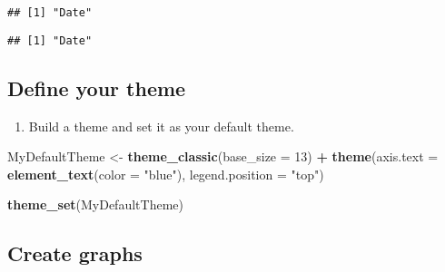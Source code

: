 \documentclass[
]{article}
\newenvironment{Shaded}{\begin{snugshade}}{\end{snugshade}}
\newcommand{\DataTypeTok}[1]{\textcolor[rgb]{0.13,0.29,0.53}{#1}}
\newcommand{\DecValTok}[1]{\textcolor[rgb]{0.00,0.00,0.81}{#1}}
\newcommand{\KeywordTok}[1]{\textcolor[rgb]{0.13,0.29,0.53}{\textbf{#1}}}
\newcommand{\NormalTok}[1]{#1}
\newcommand{\OperatorTok}[1]{\textcolor[rgb]{0.81,0.36,0.00}{\textbf{#1}}}
\newcommand{\StringTok}[1]{\textcolor[rgb]{0.31,0.60,0.02}{#1}}
\providecommand{\tightlist}{%
  \setlength{\itemsep}{0pt}\setlength{\parskip}{0pt}}
\begin{document}
\begin{verbatim}
## [1] "Date"
\end{verbatim}

\begin{Shaded}
\end{Shaded}

\begin{verbatim}
## [1] "Date"
\end{verbatim}

\hypertarget{define-your-theme}{%
\subsection{Define your theme}\label{define-your-theme}}

\begin{enumerate}
\def\labelenumi{\arabic{enumi}.}
\setcounter{enumi}{2}
\tightlist
\item
  Build a theme and set it as your default theme.
\end{enumerate}

\begin{Shaded}
\begin{Highlighting}[]
\NormalTok{MyDefaultTheme <-}\StringTok{ }\KeywordTok{theme_classic}\NormalTok{(}\DataTypeTok{base_size =} \DecValTok{13}\NormalTok{) }\OperatorTok{+}
\StringTok{  }\KeywordTok{theme}\NormalTok{(}\DataTypeTok{axis.text =} \KeywordTok{element_text}\NormalTok{(}\DataTypeTok{color =} \StringTok{"blue"}\NormalTok{),}
        \DataTypeTok{legend.position =} \StringTok{"top"}\NormalTok{)}

\KeywordTok{theme_set}\NormalTok{(MyDefaultTheme)}
\end{Highlighting}
\end{Shaded}

\hypertarget{create-graphs}{%
\subsection{Create graphs}\label{create-graphs}}
\end{document}
